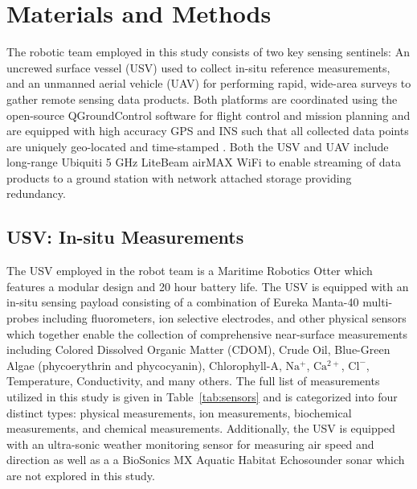 \documentclass[sensors,article,submit,pdftex,moreauthors]{Definitions/mdpi}
\begin{document}

\section{Materials and Methods}

 The robotic team employed in this study consists of two key sensing sentinels: An uncrewed surface vessel (USV) used to collect in-situ reference measurements, and an unmanned aerial vehicle (UAV) for performing rapid, wide-area surveys to gather remote sensing data products. Both platforms are coordinated using the open-source QGroundControl software for flight control and mission planning and are equipped with high accuracy GPS and INS such that all collected data points are uniquely geo-located and time-stamped \cite{qgroundcontrol}. Both the USV and UAV include long-range Ubiquiti 5 GHz LiteBeam airMAX WiFi to enable streaming of data products to a ground station with network attached storage providing redundancy.

\subsection{USV: In-situ Measurements}

The USV employed in the robot team is a Maritime Robotics Otter which features a modular design and 20 hour battery life. The USV is equipped with an in-situ sensing payload consisting of a combination of Eureka Manta-40 multi-probes including fluorometers, ion selective electrodes, and other physical sensors which together enable the collection of comprehensive near-surface measurements including Colored Dissolved Organic Matter (CDOM), Crude Oil, Blue-Green Algae (phycoerythrin and phycocyanin), Chlorophyll-A, $\mathrm{Na^+}$, $\mathrm{Ca^{2+}}$, $\mathrm{Cl^-}$, Temperature, Conductivity, and many others. The full list of measurements utilized in this study is given in Table~\ref{tab:sensors} and is categorized into four distinct types: physical measurements, ion measurements, biochemical measurements, and chemical measurements. Additionally, the USV is equipped with an ultra-sonic weather monitoring sensor for measuring air speed and direction as well as a a BioSonics MX Aquatic Habitat Echosounder sonar which are not explored in this study.

\end{document}

